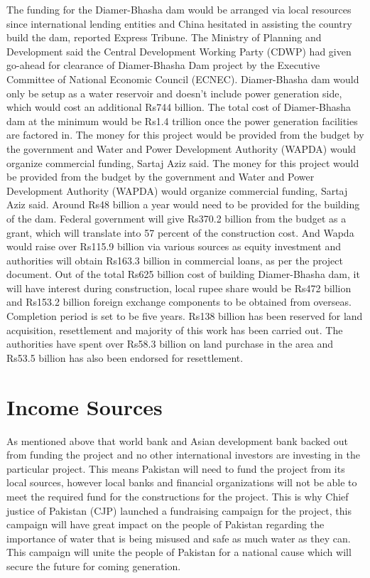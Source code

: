\documentclass[11pt, journal,letterpaper,compsoc]{IEEEtran}
\begin{document}
The funding for the Diamer-Bhasha dam would be arranged via local resources since international lending entities and China hesitated in assisting the country build the dam, reported Express Tribune. The Ministry of Planning and Development said the Central Development Working Party (CDWP) had given go-ahead for clearance of Diamer-Bhasha Dam project by the Executive Committee of National Economic Council (ECNEC). Diamer-Bhasha dam would only be setup as a water reservoir and doesn’t include power generation side, which would cost an additional Rs744 billion. The total cost of Diamer-Bhasha dam at the minimum would be Rs1.4 trillion once the power generation facilities are factored in. The money for this project would be provided from the budget by the government and Water and Power Development Authority (WAPDA) would organize commercial funding, Sartaj Aziz said. The money for this project would be provided from the budget by the government and Water and Power Development Authority (WAPDA) would organize commercial funding, Sartaj Aziz said. Around Rs48 billion a year would need to be provided for the building of the dam. Federal government will give Rs370.2 billion from the budget as a grant, which will translate into 57 percent of the construction cost. And Wapda would raise over Rs115.9 billion via various sources as equity investment and authorities will obtain Rs163.3 billion in commercial loans, as per the project document. Out of the total Rs625 billion cost of building Diamer-Bhasha dam, it will have interest during construction, local rupee share would be Rs472 billion and Rs153.2 billion foreign exchange components to be obtained from overseas. Completion period is set to be five years. Rs138 billion has been reserved for land acquisition, resettlement and majority of this work has been carried out. The authorities have spent over Rs58.3 billion on land purchase in the area and Rs53.5 billion has also been endorsed for resettlement.



 \section{Income Sources}
 As mentioned above that world bank and Asian development bank backed out from funding the project and no other international investors are investing in the particular project. This means Pakistan will need to fund the project from its local sources, however local banks and financial organizations will not be able to meet the required fund for the constructions for the project. This is why Chief justice of Pakistan (CJP) launched a fundraising campaign for the project, this campaign will have great impact on the people of Pakistan regarding the importance of water that is being misused and safe as much water as they can. This campaign will unite the people of Pakistan for a national cause which will secure the future for coming generation.
\end{document}
